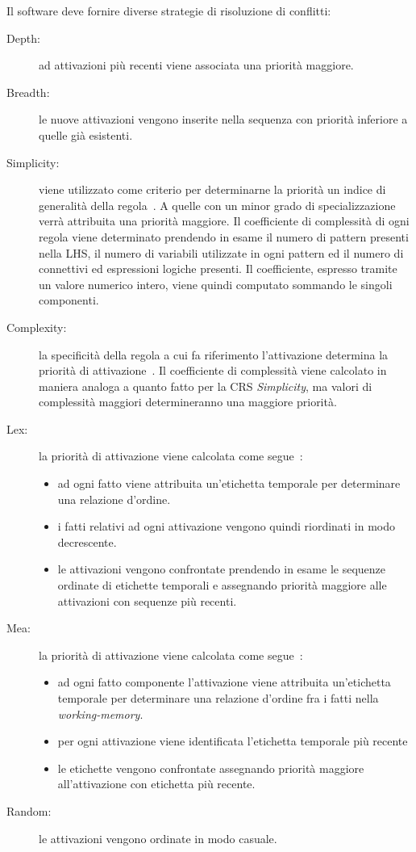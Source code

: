 Il software deve fornire diverse strategie di risoluzione di conflitti:
\begin{description}
	\item[Depth:] ad attivazioni più recenti viene associata una priorità maggiore.
	
	\item[Breadth:] le nuove attivazioni vengono inserite nella sequenza con priorità inferiore a quelle già esistenti.
	
	\item[Simplicity:] viene utilizzato come criterio per determinarne la priorità un indice di generalità della regola~\cite{clipsarch1992}. A quelle con un minor grado di specializzazione verrà attribuita una priorità maggiore. Il coefficiente di complessità di ogni regola viene determinato prendendo in esame il numero di pattern presenti nella LHS, il numero di variabili utilizzate in ogni pattern ed il numero di connettivi ed espressioni logiche presenti. Il coefficiente, espresso tramite un valore numerico intero, viene quindi computato sommando le singoli componenti.
	
	\item[Complexity:] la specificità della regola a cui fa riferimento l'attivazione determina la priorità di attivazione~\cite{clipsarch1992}. Il coefficiente di complessità viene calcolato in maniera analoga a quanto fatto per la CRS \emph{Simplicity}, ma valori di complessità maggiori determineranno una maggiore priorità.
	\item[Lex:] la priorità di attivazione viene calcolata come segue~\cite{forgyops5manual}:
		\begin{itemize}
			\item ad ogni fatto viene attribuita un'etichetta temporale per determinare una relazione d'ordine.
			\item i fatti relativi ad ogni attivazione vengono quindi riordinati in modo decrescente.
			\item le attivazioni vengono confrontate prendendo in esame le sequenze ordinate di etichette temporali e assegnando priorità maggiore alle attivazioni con sequenze più recenti.
		\end{itemize}
	\item[Mea:] la priorità di attivazione viene calcolata come segue~\cite{forgyops5manual}:
		\begin{itemize}
			\item ad ogni fatto componente l'attivazione viene attribuita un'etichetta temporale per determinare una relazione d'ordine fra i fatti nella \emph{working-memory}.
			\item per ogni attivazione viene identificata l'etichetta temporale più recente
			\item le etichette vengono confrontate assegnando priorità maggiore all'attivazione con etichetta più recente.
		\end{itemize}
	\item[Random:] le attivazioni vengono ordinate in modo casuale.
\end{description}

